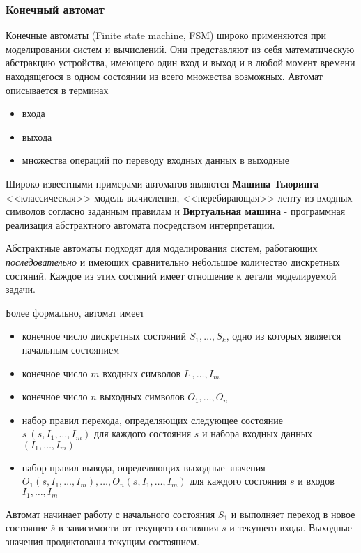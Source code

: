 \documentclass[a4paper,14pt]{extreport} %
\begin{document}
	{\subsubsection{Конечный автомат}}

Конечные автоматы (Finite state machine, FSM) широко применяются при моделировании систем и вычислений. Они представляют из себя математическую абстракцию устройства, имеющего один вход и выход и в любой момент времени находящегося в одном состоянии из всего множества возможных. Автомат описывается в терминах
\begin{itemize}
    \item входа
    \item выхода
    \item множества операций по переводу входных данных в выходные
\end{itemize}

Широко известными примерами автоматов являются \textbf{Машина Тьюринга} - <<классическая>> модель вычисления, <<перебирающая>> ленту из входных символов согласно заданным правилам и \textbf{Виртуальная машина} - программная реализация абстрактного автомата посредством интерпретации.

Абстрактные автоматы подходят для моделирования систем, работающих \textit{последовательно} и имеющих сравнительно небольшое количество дискретных состяний. Каждое из этих состяний имеет отношение к детали моделируемой задачи.

Более формально, автомат имеет
\begin{itemize}
    \item конечное число дискретных состояний $S_1, \dots, S_k$, одно из которых является начальным состоянием
    \item конечное число $m$ входных символов $I_1, \dots, I_m$
    \item конечное число $n$ выходных символов $O_1, \dots, O_n$
    \item набор правил перехода, определяющих следующее состояние \\ $\bar s \ (s,I_1, \dots, I_m)$ для каждого состояния $s$ и набора входных данных $(I_1, \dots, I_m)$
    \item набор правил вывода, определяющих выходные значения \\ $O_1(s,I_1,\dots,I_m), \dots, O_n(s,I_1,\dots,I_m)$ для каждого состояния $s$ и входов $I_1,\dots,I_m$
\end{itemize}

Автомат начинает работу с начального состояния $S_1$ и выполняет переход в новое состояние $\bar s$ в зависимости от текущего состояния $s$ и текущего входа. Выходные значения продиктованы текущим состоянием.
\end{document}
